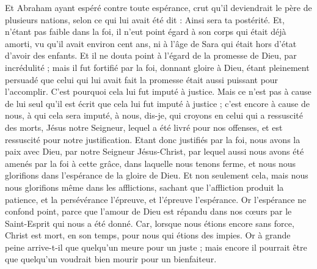 \begin{multicols}{2}
Et Abraham ayant espéré contre toute espérance, crut qu'il deviendrait le père de plusieurs nations, selon ce qui lui avait été dit : Ainsi sera ta postérité.
Et, n'étant pas faible dans la foi, il n'eut point égard à son corps qui était déjà amorti, vu qu'il avait environ cent ans, ni à l'âge de Sara qui était hors d'état d'avoir des enfants.
Et il ne douta point à l'égard de la promesse de Dieu, par incrédulité ; mais il fut fortifié par la foi, donnant gloire à Dieu,
étant pleinement persuadé que celui qui lui avait fait la promesse était aussi puissant pour l'accomplir.
C'est pourquoi cela lui fut imputé à justice.
Mais ce n'est pas à cause de lui seul qu'il est écrit que cela lui fut imputé à justice ;
c'est encore à cause de nous, à qui cela sera imputé, à nous, dis-je, qui croyons en celui qui a ressuscité des morts, Jésus notre Seigneur,
lequel a été livré pour nos offenses, et est ressuscité pour notre justification.
\VerseOne{}Etant donc justifiés par la foi, nous avons la paix avec Dieu, par notre Seigneur Jésus-Christ,
par lequel aussi nous avons été amenés par la foi à cette grâce, dans laquelle nous tenons ferme, et nous nous glorifions dans l'espérance de la gloire de Dieu.
Et non seulement cela, mais nous nous glorifions même dans les afflictions, sachant que l'affliction produit la patience,
et la persévérance l'épreuve, et l'épreuve l'espérance.
Or l'espérance ne confond point, parce que l'amour de Dieu est répandu dans nos cœurs par le Saint-Esprit qui nous a été donné.
Car, lorsque nous étions encore sans force, Christ est mort, en son temps, pour nous qui étions des impies.
Or à grande peine arrive-t-il que quelqu'un meure pour un juste ; mais encore il pourrait être que quelqu'un voudrait bien mourir pour un bienfaiteur.

\end{multicols}
